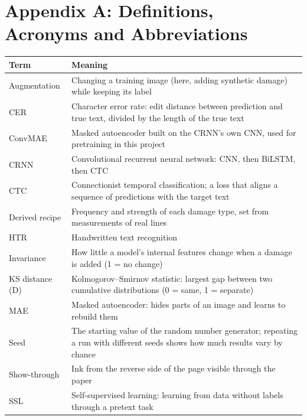 \documentclass[
  12pt,
  a4paper,
]{report}
\newcounter{none} %
\begin{document}
\chapter*{Appendix A: Definitions, Acronyms and
Abbreviations}\label{appendix-a-definitions-acronyms-and-abbreviations}

{\def\LTcaptype{none} %
\begin{longtable}[]{@{}
  >{\raggedright\arraybackslash}p{}
  >{\raggedright\arraybackslash}p{}@{}}
\toprule\noalign{}
\begin{minipage}[b]{\linewidth}\raggedright
Term
\end{minipage} & \begin{minipage}[b]{\linewidth}\raggedright
Meaning
\end{minipage} \\
\midrule\noalign{}
\endhead
\bottomrule\noalign{}
\endlastfoot
Augmentation & Changing a training image (here, adding synthetic damage)
while keeping its label \\
CER & Character error rate: edit distance between prediction and true
text, divided by the length of the true text \\
ConvMAE & Masked autoencoder built on the CRNN's own CNN, used for
pretraining in this project \\
CRNN & Convolutional recurrent neural network: CNN, then BiLSTM, then
CTC \\
CTC & Connectionist temporal classification; a loss that aligns a
sequence of predictions with the target text \\
Derived recipe & Frequency and strength of each damage type, set from
measurements of real lines \\
HTR & Handwritten text recognition \\
Invariance & How little a model's internal features change when a damage
is added (1 = no change) \\
KS distance (D) & Kolmogorov--Smirnov statistic: largest gap between two
cumulative distributions (0 = same, 1 = separate) \\
MAE & Masked autoencoder: hides parts of an image and learns to rebuild
them \\
Seed & The starting value of the random number generator; repeating a
run with different seeds shows how much results vary by chance \\
Show-through & Ink from the reverse side of the page visible through the
paper \\
SSL & Self-supervised learning: learning from data without labels
through a pretext task \\
\end{longtable}
}
\end{document}

